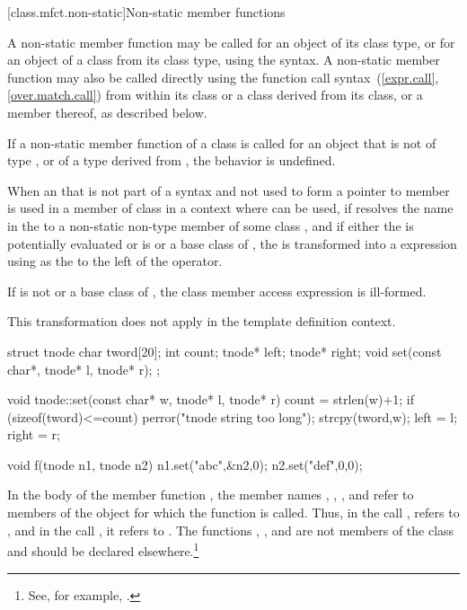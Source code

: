 [class.mfct.non-static]{Non-static member functions}%

\pnum
A non-static member function may be called for an object of
its class type, or for an object of a class 
from its class type, using the
 syntax. A non-static
member function may also be called directly using the function call
syntax~(\ref{expr.call}, \ref{over.match.call}) from within
its class or a class derived from its class, or
a member thereof, as described below.

\pnum
{}%
If a non-static member function of a class  is called for an
object that is not of type , or of a type derived from
, the behavior is undefined.

\pnum
When an  that is not part of a
 syntax and not used to form a
pointer to member is used in
a member of class  in a context where  can be
used,
if  resolves the name in the
 to a non-static non-type member of some class
,
and if either the  is potentially evaluated or
 is  or a base class of ,
the  is transformed into a
 expression using
 as the 
to the left of the  operator.
\begin{note}
If  is not  or a base class of , the class
member access expression is ill-formed.
\end{note}
This transformation does not apply in the
template definition context.
\begin{example}
\begin{codeblock}
struct tnode {
  char tword[20];
  int count;
  tnode* left;
  tnode* right;
  void set(const char*, tnode* l, tnode* r);
};

void tnode::set(const char* w, tnode* l, tnode* r) {
  count = strlen(w)+1;
  if (sizeof(tword)<=count)
      perror("tnode string too long");
  strcpy(tword,w);
  left = l;
  right = r;
}

void f(tnode n1, tnode n2) {
  n1.set("abc",&n2,0);
  n2.set("def",0,0);
}
\end{codeblock}

In the body of the member function , the member names
, , , and  refer to
members of the object for which the function is called. Thus, in the
call ,  refers to
, and in the call , it refers
to . The functions , , and
 are not members of the class  and should be
declared elsewhere.\footnote{See, for example, .}
\end{example}

